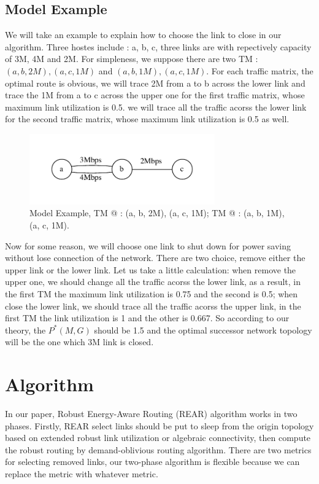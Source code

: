 \documentclass[conference]{IEEEtran}
\makeatletter
\newcommand{\Rmnum}[1]{\expandafter\@slowromancap\romannumeral #1@}
\makeatother
\begin{document}
\subsection{Model Example}
We will take an example to explain how to choose the link to close in our algorithm.
Three hostes include : a, b, c, three links are with repectively capacity of 3M, 4M and 2M. For simpleness, we suppose
there are two TM : ${(a,b,2M), (a,c,1M)}$ and ${(a,b,1M), (a,c,1M)}$. For each traffic matrix, the optimal route is
obvious, we will trace 2M from a to b across the lower link and trace the 1M from a to c across the upper one
for the first traffic matrix, whose maximum link utilization is 0.5. we will trace all the traffic acorss the
lower link for the second traffic matrix, whose maximum link utilization is 0.5 as well.


\begin{figure}[!t]
\centering
\vspace*{0.1in}
\includegraphics[width=8cm]{3-nodes-example}
\caption{Model Example, TM \Rmnum{1} : (a, b, 2M), (a, c, 1M); TM \Rmnum{2} : (a, b, 1M), (a, c, 1M).}
\label{label}
\vspace*{0.1in}
\end{figure}


Now for some reason, we will choose one link to shut down for power saving without lose connection of the network.
There are two choice, remove either the upper link or the lower link. Let us take a little calculation: when
remove the upper one, we should change all the traffic acorss the lower link, as a result, in the first
TM the maximum link utilization is 0.75 and the second is 0.5; when close the lower link, we should trace all the
traffic acorss the upper link, in the first TM the link utilization is 1 and the other is 0.667.
So according to our theory, the $P^{*}(M, G)$ should be 1.5 and the optimal successor network topology will be
the one which 3M link is closed.

\section{Algorithm}
In our paper, Robust Energy-Aware Routing (REAR) algorithm works in two phases. Firstly, REAR select links 
should be put to sleep from the origin topology based on extended robust link utilization or algebraic connectivity, 
then compute the robust routing by demand-oblivious routing algorithm. There are two metrics
for selecting removed links, our two-phase algorithm is flexible because we can replace the metric with whatever
metric.
\end{document}
